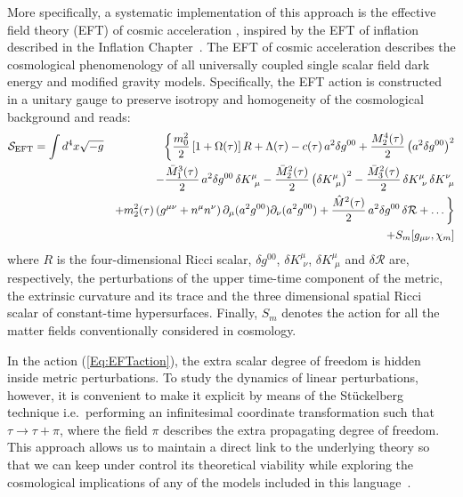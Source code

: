 More specifically, a systematic implementation of this approach is the effective field theory (EFT)
of cosmic acceleration \cite{Gubitosi:2012hu,Bloomfield:2012ff}, inspired by the EFT  of inflation described in the Inflation Chapter~\cite{Creminelli:2006xe,Cheung:2007st,Weinberg:2008hq,Creminelli:2008wc,Park:2010cw,Jimenez:2011nn}.    The EFT of cosmic acceleration describes the cosmological phenomenology of all universally coupled single scalar field dark energy and modified gravity models. Specifically, the EFT action is constructed in a unitary gauge to preserve isotropy and homogeneity of the cosmological background and reads:
%
\begin{eqnarray} \label{Eq:EFTaction}
\mathcal{S}_{\rm EFT} = \int d^4x \sqrt{-g}&& \bigg\{ \frac{m_0^2}{2} \left[1+\Omega(\tau)\right] R + \Lambda(\tau) - c(\tau)\,a^2\delta g^{00} + \frac{M_2^4 (\tau)}{2} \left( a^2\delta g^{00} \right)^2 \nonumber \\ 
&&   - \frac{\bar{M}_1^3 (\tau)}{2} \, a^2\delta g^{00}\,\delta K{^\mu_{\,\,\mu}}  - \frac{\bar{M}_2^2 (\tau)}{2} \left( \delta {K}{^\mu_{\,\,\mu}}\right)^2   - \frac{\bar{M}_3^2 (\tau)}{2} \,\delta {K}{^\mu_{\,\,\nu}}\,\delta {K}{^\nu_{\,\,\mu}} \nonumber \\
&& + m_2^2(\tau)\left(g^{\mu\nu}+n^{\mu} n^{\nu}\right)\partial_{\mu}(a^2g^{00})\partial_{\nu}(a^2g^{00}) +\frac{\hat{M}^2(\tau)}{2} \, a^2 \delta g^{00}\,\delta \mathcal{R}+	\ldots \bigg\}  \nonumber \\
&& + S_{m} [g_{\mu \nu}, \chi_m ]
\end{eqnarray}
%
where $R$ is the four-dimensional Ricci scalar, $\delta g^{00}$, $\delta K{^\mu_{\,\,\nu}}$, $\delta K{^\mu_{\,\,\mu}}$ and  $\delta \mathcal{R}$ are, respectively, the perturbations of the upper time-time component of the metric, the extrinsic curvature and its trace and the three dimensional spatial Ricci scalar of constant-time hypersurfaces. Finally,  $S_m$ denotes the action for all the matter fields conventionally considered in cosmology. 

In the action (\ref{Eq:EFTaction}), the  extra scalar degree of freedom is hidden inside metric perturbations. 
To study the dynamics of linear perturbations, however, it is convenient to make it explicit by means of  the St\"{u}ckelberg technique i.e.~performing an infinitesimal coordinate transformation such that $\tau\rightarrow \tau+\pi$, where the field $\pi$ describes the extra propagating degree of freedom. This approach allows us to maintain a direct link to the underlying theory so that we can keep under control its theoretical viability while exploring the cosmological implications of any of the models included in this language~\cite{Raveri:2014cka}. 

